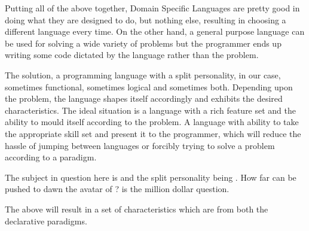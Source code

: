 \documentclass[thesis-solanki.tex]{subfiles}
\begin{document}
Putting all of the above together, Domain Specific Languages are pretty good in doing what they are designed to do,
but nothing else, resulting in choosing a different language every time.
On the other hand, a general purpose language can be used for solving a wide variety of problems but 
the programmer ends up writing some code dictated by the language rather than the problem.

\par The solution, a programming language with a split personality, in our case, sometimes functional, sometimes logical and sometimes 
both. 
Depending upon the problem, the language shapes itself accordingly and exhibits the desired characteristics. The ideal situation is a 
language with a rich 
feature set and the ability to mould itself according to the problem. A language with ability to take the appropriate skill set and present 
it to the 
programmer, which will reduce the hassle of jumping between languages or forcibly trying to solve a problem according to a paradigm.

\par The subject in question here is  and the split personality being . How far can  be pushed to 
dawn the avatar of \xxx{ }?
 is the million dollar question.

The above will result in a set of characteristics which are from both the declarative paradigms. 
   
\end{document}
